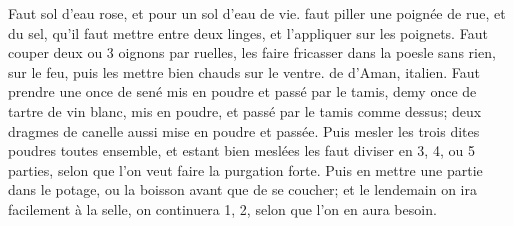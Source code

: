 \pend%
\pstart%
\protect{} %
Faut 
sol d'eau rose,\protect{} et pour un sol d'eau de vie.\protect{}
\pend%
\pstart%
 faut piller une poign\'{e}e de rue\protect{}, et du sel\protect{}, qu'il faut mettre entre deux linges, et l'appliquer sur les %
poignets.%
\pend%
\pstart%
\protect{}
Faut couper deux ou 3 oignons\protect{} par ruelles, les faire fricasser dans la poesle sans rien, sur le feu, puis les mettre bien chauds sur le ventre.
\pend%
\pstart%
\protect{}%
de d'A\-man,\protect{} italien.
Faut prendre une once de sen\'{e}\protect{} mis en poudre et pass\'{e} par le tamis, demy once de tartre de vin\protect{} blanc, mis en poudre, et pass\'{e} par le tamis comme dessus; deux dragmes de canelle\protect{} aussi mise en poudre et pass\'{e}e. Puis mesler les trois dites poudres toutes ensemble, et estant bien mesl\'{e}es les faut diviser en 3, 4, ou 5 parties, selon que l'on veut faire la purgation forte. Puis en mettre une partie dans le potage, ou la boisson avant que de se coucher; et le lendemain on ira facilement \`{a} la selle, on continuera 1, 2,
selon que l'on en aura besoin.%
%
\pend%
\count{}
\count{}
\count{}
